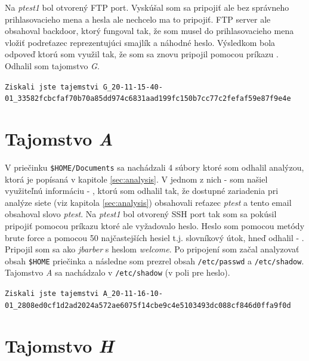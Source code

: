 \documentclass[11pt,a4paper]{article}
\begin{document}
Na \textit{ptest1} bol otvorený FTP port. Vyskúšal som sa pripojiť ale bez správneho prihlasovacieho mena a hesla ale nechcelo ma to pripojiť. FTP server ale obsahoval backdoor, ktorý fungoval tak, že som musel do prihlasovacieho mena vložiť podreťazec \uv{\textit{:)}} reprezentujúci smajlík a náhodné heslo. Výsledkom bola odpoveď  ktorú som využil tak, že som sa znovu pripojil pomocou príkazu . Odhalil som tajomstvo \textit{G}.

\begin{center}
\small{\texttt{Ziskali jste tajemstvi G\_20-11-15-40-01\_33582fcbcfaf70b70a85dd974c6831aad199fc150b7cc77c2fefaf59e87f9e4e}}
\end{center}

\section{Tajomstvo \textit{A}}\label{sec:A}

V priečinku \texttt{\$HOME/Documents} sa nachádzali 4 súbory ktoré som odhalil analýzou, ktorá je popísaná v kapitole \ref{sec:analysis}. V jednom z nich - \texttt{} som našiel využiteľnú informáciu - , ktorú som odhalil tak, že dostupné zariadenia pri analýze siete (viz kapitola \ref{sec:analysis}) obsahovali reťazec \textit{ptest} a tento email obsahoval slovo \textit{ptest}. Na \textit{ptest1} bol otvorený SSH port tak som sa pokúsil pripojiť pomocou príkazu  ktoré ale vyžadovalo heslo. Heslo som pomocou metódy brute force a pomocou 50 najčastejších hesiel t.j. slovníkový útok, hneď odhalil - . Pripojil som sa ako \textit{jbarber} s heslom \textit{welcome}. Po pripojení som začal analyzovať obsah \texttt{\$HOME} priečinka a následne som prezrel obsah \texttt{/etc/passwd} a \texttt{/etc/shadow}. Tajomstvo \textit{A} sa nachádzalo v \texttt{/etc/shadow} (v poli pre heslo).

\begin{center}
\small{\texttt{Ziskali jste tajemstvi A\_20-11-16-10-01\_2808ed0cf1d2ad2024a572ae6075f14cbe9c4e5103493dc088cf846d0ffa9f0d}}
\end{center}

\section{Tajomstvo \textit{H}}\label{sec:H}
\end{document}
